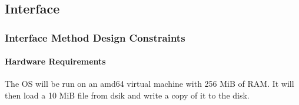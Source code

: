 %
%
%
%
%

\subsection{Interface}

\subsubsection{Interface Method Design Constraints}
\paragraph{Hardware Requirements} The OS will be run on an amd64 virtual machine with 256 MiB of RAM. It will then load a 10 MiB file from dsik and write a copy of it to the disk.

